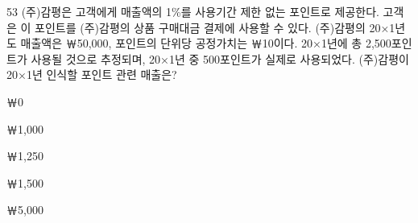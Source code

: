 \begin{question}{53}
(주)감평은 고객에게 매출액의 1\%를 사용기간 제한 없는 포인트로 제공한다. 고객은 이 포인트를 (주)감평의 상품 구매대금 결제에 사용할 수 있다. (주)감평의 20×1년도 매출액은 ￦50,000, 포인트의 단위당 공정가치는 ￦10이다. 20×1년에 총 2,500포인트가 사용될 것으로 추정되며, 20×1년 중 500포인트가 실제로 사용되었다. (주)감평이 20×1년 인식할 포인트 관련 매출은?
\begin{choices}
  \item ￦0
  \item ￦1,000
  \item ￦1,250
  \item ￦1,500
  \item ￦5,000
\end{choices}
\end{question}
